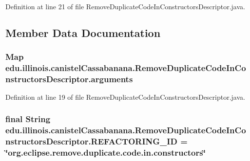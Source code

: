 Definition at line 21 of file RemoveDuplicateCodeInConstructorsDescriptor.java.



\subsection{Member Data Documentation}
\hypertarget{classedu_1_1illinois_1_1canistelCassabanana_1_1RemoveDuplicateCodeInConstructorsDescriptor_aa4fa551e012664ff7066622e24ceb27c}{
\subsubsection[{arguments}]{\setlength{\rightskip}{0pt plus 5cm}Map {\bf edu.illinois.canistelCassabanana.RemoveDuplicateCodeInConstructorsDescriptor.arguments}}}
\label{classedu_1_1illinois_1_1canistelCassabanana_1_1RemoveDuplicateCodeInConstructorsDescriptor_aa4fa551e012664ff7066622e24ceb27c}


Definition at line 19 of file RemoveDuplicateCodeInConstructorsDescriptor.java.

\hypertarget{classedu_1_1illinois_1_1canistelCassabanana_1_1RemoveDuplicateCodeInConstructorsDescriptor_a9ad2a0ed594137b3a3bb13a9e318152a}{
\subsubsection[{REFACTORING\_\-ID}]{\setlength{\rightskip}{0pt plus 5cm}final String {\bf edu.illinois.canistelCassabanana.RemoveDuplicateCodeInConstructorsDescriptor.REFACTORING\_\-ID} = \char`\"{}org.eclipse.remove.duplicate.code.in.constructors\char`\"{}}}
\label{classedu_1_1illinois_1_1canistelCassabanana_1_1RemoveDuplicateCodeInConstructorsDescriptor_a9ad2a0ed594137b3a3bb13a9e318152a}


